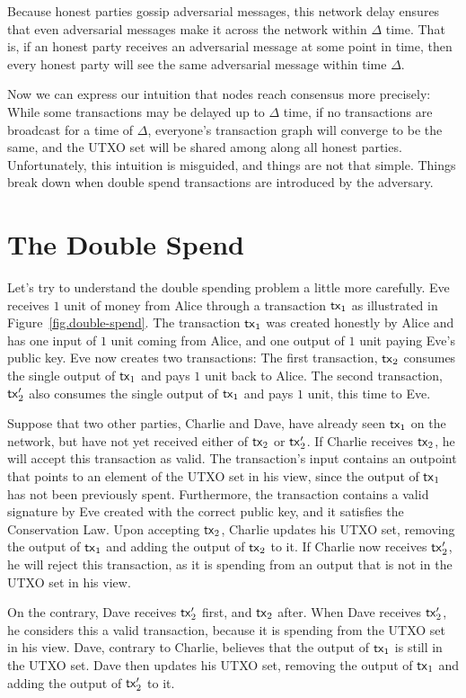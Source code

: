 Because honest parties gossip adversarial messages, this network delay ensures that
even adversarial messages make it across the network within $\Delta$ time. That is,
if an honest party receives an adversarial message at some point in time, then every
honest party will see the same adversarial message within time $\Delta$.

Now we can express our intuition that nodes reach consensus more precisely:
While some transactions may be delayed up to $\Delta$ time,
if no transactions are broadcast for a time of $\Delta$, everyone's transaction
graph will converge to be the same, and the UTXO set will be shared among along
all honest parties. Unfortunately, this intuition is misguided, and things are not
that simple. Things break down when double spend transactions are introduced
by the adversary.

\section{The Double Spend}

Let's try to understand the double spending problem a little more carefully. Eve
receives $1$ unit of money from Alice through a transaction $\mathsf{tx}_1$ as illustrated in
Figure~\ref{fig.double-spend}. The transaction $\mathsf{tx}_1$ was created honestly by Alice
and has one input of $1$ unit coming from Alice, and one output of $1$ unit paying
Eve's public key. Eve now creates two transactions: The first transaction, $\mathsf{tx}_2$
consumes the single output of $\mathsf{tx}_1$ and pays $1$ unit back to Alice. The second transaction,
$\mathsf{tx}_2'$ also consumes the single output of $\mathsf{tx}_1$ and pays $1$ unit, this time to Eve.

Suppose that two other parties, Charlie and Dave, have already seen $\mathsf{tx}_1$ on the network,
but have not yet received either of $\mathsf{tx}_2$ or $\mathsf{tx}_2'$. If Charlie receives $\mathsf{tx}_2$, he
will accept this transaction as valid. The transaction's input contains an outpoint that
points to an element of the UTXO set in his view, since the output of $\mathsf{tx}_1$ has not been
previously spent. Furthermore, the transaction contains a valid signature by Eve created
with the correct public key, and it satisfies the Conservation Law. Upon accepting $\mathsf{tx}_2$,
Charlie updates his UTXO set, removing the output of $\mathsf{tx}_1$ and adding the output of
$\mathsf{tx}_2$ to it. If Charlie now receives $\mathsf{tx}_2'$, he will reject this transaction, as
it is spending from an output that is not in the UTXO set in his view.

On the contrary, Dave receives $\mathsf{tx}_2'$ first, and $\mathsf{tx}_2$ after. When Dave receives $\mathsf{tx}_2'$,
he considers this a valid transaction, because it is spending from the UTXO set in his view.
Dave, contrary to Charlie, believes that the output of $\mathsf{tx}_1$ is still in the UTXO set.
Dave then updates his UTXO set, removing the output of $\mathsf{tx}_1$ and adding the output
of $\mathsf{tx}_2'$ to it.

